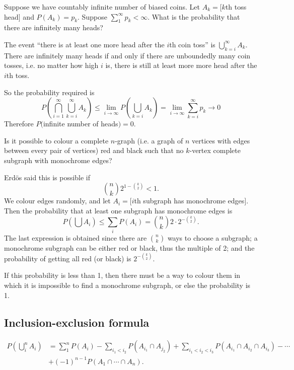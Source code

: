\documentclass[a4paper]{article}
\begin{document}
\begin{eg}
  Suppose we have countably infinite number of biased coins. Let $A_k = [k$th toss head$]$ and $P(A_k) = p_k$. Suppose $\sum_1^\infty p_k < \infty$. What is the probability that there are infinitely many heads?

  The event ``there is at least one more head after the $i$th coin toss'' is $\bigcup_{k = i}^\infty A_k$. There are infinitely many heads if and only if there are unboundedly many coin tosses, i.e. no matter how high $i$ is, there is still at least more more head after the $i$th toss.

  So the probability required is
  \[
    P\left(\bigcap_{i = 1}^\infty\bigcup _{k = i}^\infty A_k\right) \leq \lim_{i \to \infty} P\left(\bigcup_{k = i}A_k\right)= \lim_{i\to \infty}\sum_{k = i}^\infty p_k \to 0
  \]
  Therefore $P($infinite number of heads$) = 0$.
\end{eg}

\begin{eg}[Erdos 1947]
  Is it possible to colour a complete $n$-graph (i.e. a graph of $n$ vertices with edges between every pair of vertices) red and black such that no $k$-vertex complete subgraph with monochrome edges?

  Erd\"os said this is possible if
  \[
    \binom{n}{k} 2^{1 - \binom{k}{2}} < 1.
  \]
  We colour edges randomly, and let $A_i=[i$th subgraph has monochrome edges$]$. Then the probability that at least one subgraph has monochrome edges is
  \[
    P\left(\bigcup A_i\right) \leq \sum_i P(A_i) = \binom{n}{k} 2\cdot 2^{-\binom{k}{2}}.
  \]
  The last expression is obtained since there are $\binom{n}{k}$ ways to choose a subgraph; a monochrome subgraph can be either red or black, thus the multiple of 2; and the probability of getting all red (or black) is $2^{-\binom{k}{2}}$.

  If this probability is less than 1, then there must be a way to colour them in which it is impossible to find a monochrome subgraph, or else the probability is 1.
\end{eg}

\subsection{Inclusion-exclusion formula}
\begin{thm}
  \begin{align*}
    P\left(\bigcup_i^n A_i\right) &= \sum_1^n P(A_i) - \sum_{i_1 < i_2} P(A_{i_1}\cap A_{j_2}) + \sum_{i_1 < i_2 < i_3}P(A_{i_1}\cap A_{i_2} \cap A_{i_3}) - \cdots\\
    &+ (-1)^{n - 1} P(A_1\cap \cdots \cap A_n).
  \end{align*}
\end{thm}
\end{document}
